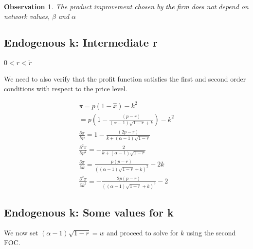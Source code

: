 \documentclass[12pt]{article}
\newtheorem{observation}{Observation}
\numberwithin{equation}{section}
\begin{document}
\begin{observation}
The product improvement chosen by the firm does not depend on network values, $\beta$ and $\alpha$
\end{observation}


\subsection{Endogenous k: Intermediate r}
$0<r<\tilde{r}$

We need to also verify that the profit function satisfies the first and second order conditions with respect to the price level.

\begin{align*}
\pi = p\left(1-\hat{x}\right) - k^2 \\
=p\left(1-\frac{ (p-r)}{(\alpha-1)
\sqrt{ 1-r }
+k} \right) -k^2
\\
\frac{\partial \pi }{\partial p} = 1-\frac{ (2p-r)}{
k+ (\alpha-1)\sqrt{ 1 -r }} \\
\frac{\partial^2 \pi }{\partial p^2}
= -\frac{ 2}{
k+ (\alpha-1)\sqrt{ 1 -r }} \\
\frac{\partial \pi}{\partial k} = \frac{ p(p-r)}{((\alpha-1)
\sqrt{ 1-r }
+k)^2} -2k
\\
\frac{\partial^2 \pi}{\partial k^2} = -\frac{2 p(p-r)}{((\alpha-1)
\sqrt{ 1-r }
+k)^3} -2 
\end{align*}

\subsection{Endogenous k: Some values for k}

We now set $ (\alpha-1)\sqrt{ 1 -r }=w$ and proceed to solve for $k$ using the second FOC.  
\end{document}
